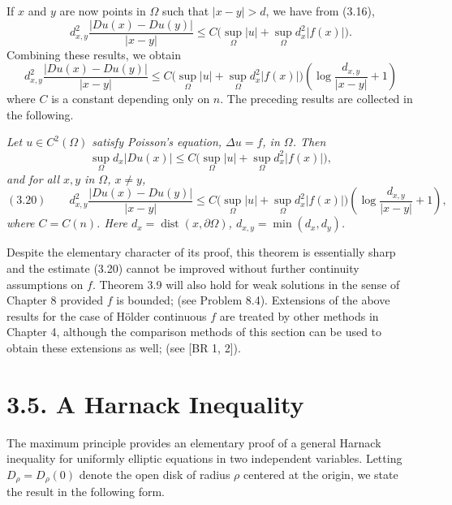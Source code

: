 If $x$ and $y$ are now points in $\Omega$ such that $\lvert x-y\rvert > d$, we have from (3.16),
\[
d_{x,y}^{2}\frac{\lvert Du(x)-Du(y)\rvert}{\lvert x-y\rvert}
\le C\bigl(\sup_{\Omega}\lvert u\rvert+\sup_{\Omega} d_{x}^{2}\lvert f(x)\rvert\bigr).
\]
Combining these results, we obtain
\[
d_{x,y}^{2}\frac{\lvert Du(x)-Du(y)\rvert}{\lvert x-y\rvert}
\le C\bigl(\sup_{\Omega}\lvert u\rvert+\sup_{\Omega} d_{x}^{2}\lvert f(x)\rvert\bigr)
\left(\log\frac{d_{x,y}}{\lvert x-y\rvert}+1\right)
\]
where $C$ is a constant depending only on $n$.
The preceding results are collected in the following.

\begin{theorem}\label{gt-ch3-poisson}
\textit{Let $u \in C^2(\Omega)$ satisfy Poisson's equation, $\Delta u = f$, in $\Omega$. Then}
\[
\sup_{\Omega} d_{x}\lvert Du(x)\rvert \le C\bigl(\sup_{\Omega}\lvert u\rvert+\sup_{\Omega} d_{x}^{2}\lvert f(x)\rvert\bigr),
\]
\textit{and for all $x, y$ in $\Omega$, $x \neq y$,}
\[
(3.20)\qquad
d_{x,y}^{2}\frac{\lvert Du(x)-Du(y)\rvert}{\lvert x-y\rvert}
\le C\bigl(\sup_{\Omega}\lvert u\rvert+\sup_{\Omega} d_{x}^{2}\lvert f(x)\rvert\bigr)
\left(\log\frac{d_{x,y}}{\lvert x-y\rvert}+1\right),
\]
\textit{where $C = C(n)$. Here $d_x = \operatorname{dist}(x,\partial\Omega)$, $d_{x,y} = \min(d_x,d_y)$.}
\end{theorem}

Despite the elementary character of its proof, this theorem is essentially sharp and the estimate (3.20) cannot be improved without further continuity assumptions on $f$. Theorem 3.9 will also hold for weak solutions in the sense of Chapter 8 provided $f$ is bounded; (see Problem 8.4). Extensions of the above results for the case of H\"older continuous $f$ are treated by other methods in Chapter 4, although the comparison methods of this section can be used to obtain these extensions as well; (see [BR 1, 2]).

\section*{3.5. A Harnack Inequality}

The maximum principle provides an elementary proof of a general Harnack inequality for uniformly elliptic equations in two independent variables. Letting $D_{\rho}=D_{\rho}(0)$ denote the open disk of radius $\rho$ centered at the origin, we state the result in the following form.

